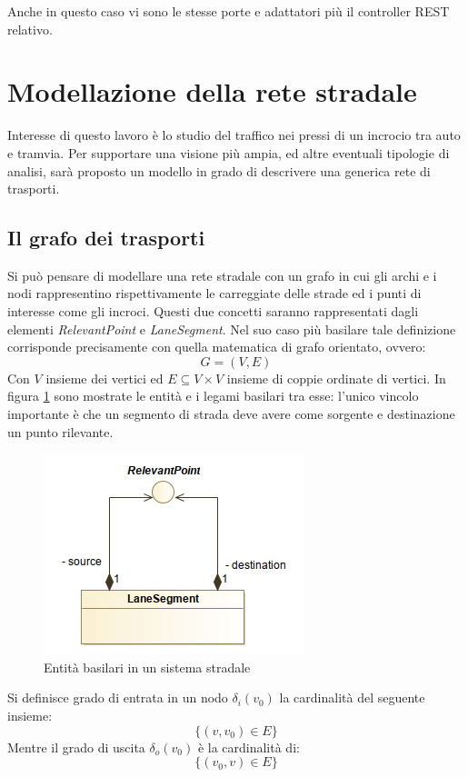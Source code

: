 Anche in questo caso vi sono le stesse porte e adattatori più il controller REST relativo.




\section{Modellazione della rete stradale}
Interesse di questo lavoro è lo studio del traffico nei pressi di un incrocio tra auto e tramvia.
Per supportare una visione più ampia, ed altre eventuali tipologie di analisi, sarà proposto un modello in grado di descrivere una generica rete di trasporti.

\subsection{Il grafo dei trasporti}
Si può pensare di modellare una rete stradale con un grafo in cui gli archi e i nodi rappresentino rispettivamente le carreggiate delle strade ed i punti di interesse come gli incroci.
Questi due concetti saranno rappresentati dagli elementi \textit{RelevantPoint} e \textit{LaneSegment}.
Nel suo caso più basilare tale definizione corrisponde precisamente con quella matematica di grafo orientato, ovvero:
$$G = (V, E)$$
Con $V$ insieme dei vertici ed $E \subseteq V \times V$ insieme di coppie ordinate di vertici\cite{data_structures}.
In figura \ref{fig:model00} sono mostrate le entità e i legami basilari tra esse: l'unico vincolo importante è che un segmento di strada deve avere come sorgente e destinazione un punto rilevante.

\begin{figure}[h]
	\centering
	\includegraphics[scale=0.5]{img/model00}
	\caption{Entità basilari in un sistema stradale}
	\label{fig:model00}
\end{figure}

Si definisce grado di entrata in un nodo $\delta_i(v_0)$ la cardinalità del seguente insieme:
$$\{(v, v_0) \in E\}$$
Mentre il grado di uscita $\delta_o(v_0)$ è la cardinalità di:
$$\{(v_0, v) \in E\}$$

